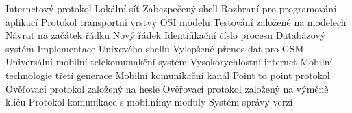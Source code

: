 
\abbrv[IP]     Internetový protokol
\abbrv[LAN]     Lokální síť
\abbrv[SSH]     Zabezpečený shell
\abbrv[API]             Rozhraní pro programování aplikací
\abbrv[TCP]             Protokol transportní vrstvy OSI modelu
\abbrv[MBT]             Testování založené na modelech
\abbrv[CR]              Návrat na začátek řádku
\abbrv[LF]              Nový řádek
\abbrv[PID]             Identifikační číslo procesu
\abbrv[MySQL]           Databázový systém
\abbrv[Bash]            Implementace Unixového shellu
\abbrv[EDGE]            Vylepšené přenos dat pro GSM
\abbrv[UMTS]            Universální mobilní telekomunakční systém
\abbrv[LTE]             Vysokorychlostní internet
\abbrv[3G]              Mobilní technologie třetí generace
\abbrv[CDMA]            Mobilní komunikační kanál
\abbrv[PPP]             Point to point protokol
\abbrv[PAP]             Ověřovací protokol založený na hesle
\abbrv[CHAP]            Ověřovací protokol založený na výměně klíču
\abbrv[AT]              Protokol komunikace s mobilnímy moduly
\abbrv[GIT]            Systém správy verzí



\stopAbbreviations
\endinput
